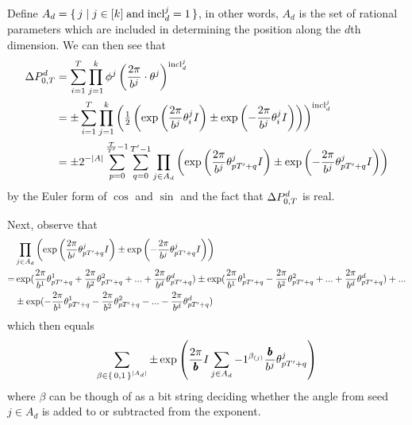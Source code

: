 Define $A_d = \set{j \mid j \in [k] \; \text{and}\; \inclIndic{d}{j} = 1}$, in other words,
$A_d$ is the set of rational parameters which are included in determining the position along the $d$th dimension.
We can then see that
\begin{align*}
\changeTotalOneDim &=\sum_{i = 1}^T \combSingleTerm{d}\\
  &=\pm\sum_{i = 1}^T \prod_{j = 1}^k \left(\half \left(\exp\left({\numbToAngle \rationalAngle{i} I}\right) \pm \exp\left(-\numbToAngle \rationalAngle{i} I\right)\right)\right)^\inclIndic{d}{j}\\
  &= \pm 2^{-|A|} \sum_{p= 0}^{\frac{\totalPeriod}{\rationalPeriodTotal} - 1} \sum_{q = 0}^{\rationalPeriodTotal - 1}
    \prod_{j \in A_d} \left(
      \exp\left(\numbToAngle\rationalAngle{p \rationalPeriodTotal + q} I\right) \pm  \exp\left(-\numbToAngle\rationalAngle{p \rationalPeriodTotal + q} I\right)\right)
\end{align*}
by the Euler form of $\cos$ and $\sin$ and the fact that $\changeTotalOneDim$ is real.

\newcommand{\periodFrac}{\frac{\totalPeriod}{\rationalPeriod}}
\newcommand{\periodFracRational}{\frac{\rationalPeriodTotal}{\rationalPeriod}}

Next, observe that 
\begin{align*}
  &\prod_{j \in A_d} \left(
      \exp\left(\numbToAngle\rationalAngle{p \rationalPeriodTotal + q} I\right) \pm  \exp\left(-\numbToAngle\rationalAngle{p \rationalPeriodTotal + q} I\right)\right)\\
 =& 
  \exp(\numbToAngleNoJ{1}\rationalAngleJ{p \rationalPeriodTotal + q}{1} + \numbToAngleNoJ{2}\rationalAngleJ{p \rationalPeriodTotal + q}{2} + ... + \numbToAngleNoJ{d}\rationalAngleJ{p \rationalPeriodTotal + q}{d}) 
  \pm \exp(\numbToAngleNoJ{1}\rationalAngleJ{p \rationalPeriodTotal + q}{1} - \numbToAngleNoJ{2}\rationalAngleJ{p \rationalPeriodTotal + q}{2} + ... + \numbToAngleNoJ{d}\rationalAngleJ{p \rationalPeriodTotal + q}{d}) + ... \\
  &\pm \exp(-\numbToAngleNoJ{1}\rationalAngleJ{p \rationalPeriodTotal + q}{1} - \numbToAngleNoJ{2}\rationalAngleJ{p \rationalPeriodTotal + q}{2} - ... - \numbToAngleNoJ{d}\rationalAngleJ{p \rationalPeriodTotal + q}{d})
\end{align*}
which then equals
\begin{equation}
 \sum_{\beta \in \set{0,1}^{|A_d|}} 
		\pm
    \exp\left(
      	\commonToAngle I
        \sum_{j \in A_d} -1 ^ {\beta_{(j)}}
          \numbToCommon \rationalAngle{p \rationalPeriodTotal + q}
      \right)
\end{equation}
where $\beta$ can be though of as a bit string deciding whether the angle from seed
$j \in A_d$ is added to or subtracted from the exponent.

